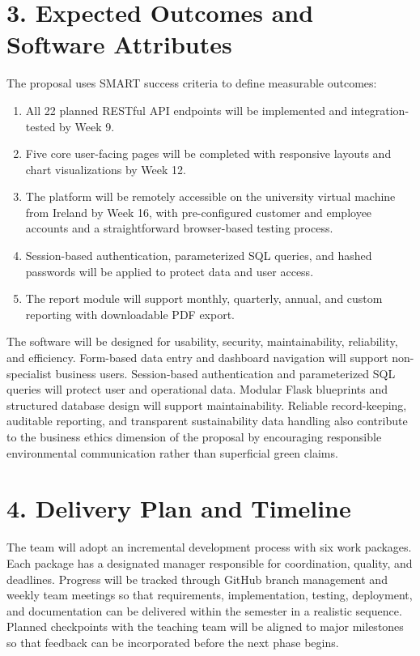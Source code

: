 \documentclass[10pt,a4paper]{article}
\begin{document}
\section*{3. Expected Outcomes and Software Attributes}
The proposal uses SMART success criteria to define measurable outcomes:
\begin{enumerate}[leftmargin=1.4em,itemsep=2pt,topsep=2pt]
    \item All 22 planned RESTful API endpoints will be implemented and integration-tested by Week 9.
    \item Five core user-facing pages will be completed with responsive layouts and chart visualizations by Week 12.
    \item The platform will be remotely accessible on the university virtual machine from Ireland by Week 16, with pre-configured customer and employee accounts and a straightforward browser-based testing process.
    \item Session-based authentication, parameterized SQL queries, and hashed passwords will be applied to protect data and user access.
    \item The report module will support monthly, quarterly, annual, and custom reporting with downloadable PDF export.
\end{enumerate}

The software will be designed for usability, security, maintainability, reliability, and efficiency. Form-based data entry and dashboard navigation will support non-specialist business users. Session-based authentication and parameterized SQL queries will protect user and operational data. Modular Flask blueprints and structured database design will support maintainability. Reliable record-keeping, auditable reporting, and transparent sustainability data handling also contribute to the business ethics dimension of the proposal by encouraging responsible environmental communication rather than superficial green claims.

\section*{4. Delivery Plan and Timeline}
The team will adopt an incremental development process with six work packages. Each package has a designated manager responsible for coordination, quality, and deadlines. Progress will be tracked through GitHub branch management and weekly team meetings so that requirements, implementation, testing, deployment, and documentation can be delivered within the semester in a realistic sequence. Planned checkpoints with the teaching team will be aligned to major milestones so that feedback can be incorporated before the next phase begins.
\end{document}
